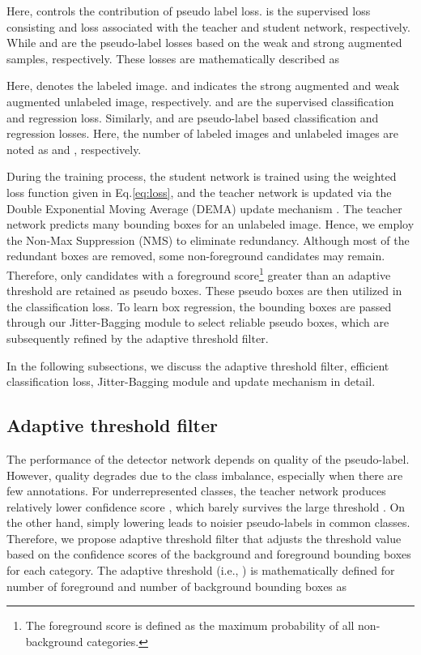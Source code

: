\documentclass[10pt,twocolumn,letterpaper]{article}
\begin{document}
Here,  controls the contribution of pseudo label loss.  is the supervised loss consisting  and  loss associated with the teacher and student network, respectively. While  and  are the pseudo-label losses based on the weak and strong augmented samples, respectively. These losses are mathematically described as
\vspace{-1em}
\vspace{-0.5em}

Here,  denotes the  labeled image.  and  indicates the  strong augmented and weak augmented unlabeled image, respectively.  and  are the supervised classification and regression loss. Similarly,  and  are pseudo-label based classification and regression losses. Here, the number of labeled images and unlabeled images are noted as  and , respectively.

During the training process, the student network is trained using the weighted loss function given in Eq.\ref{eq:loss}, and the teacher network is updated via the Double Exponential Moving Average (DEMA) update mechanism \cite{DEMA2}. The teacher network predicts many bounding boxes for an unlabeled image. Hence, we employ the Non-Max Suppression (NMS) to eliminate redundancy. Although most of the redundant boxes are removed, some non-foreground candidates may remain. Therefore, only candidates with a foreground score\footnote{The foreground score is defined as the maximum probability of all non-background categories.} greater than an adaptive threshold are retained as pseudo boxes. 
These pseudo boxes are then utilized in the classification loss. To learn box regression, the bounding boxes are passed through our Jitter-Bagging module to select reliable pseudo boxes, which are subsequently refined by the adaptive threshold filter. 

In the following subsections, we discuss the adaptive threshold filter, efficient classification loss, Jitter-Bagging module and update mechanism in detail.




\subsection{Adaptive threshold filter}
The performance of the detector network depends on quality of the pseudo-label. However, quality degrades due to the class imbalance, especially when there are few annotations. For underrepresented classes, the teacher network produces relatively lower confidence score \cite{dave2021evaluating}, which barely survives the large threshold . On the other hand, simply lowering  leads to noisier pseudo-labels in common classes. Therefore, we propose adaptive threshold filter that adjusts the threshold value based on the confidence scores of the background and foreground bounding boxes for each category.
The adaptive threshold (i.e., ) is mathematically defined for  number of foreground and  number of background bounding boxes as
\end{document}
